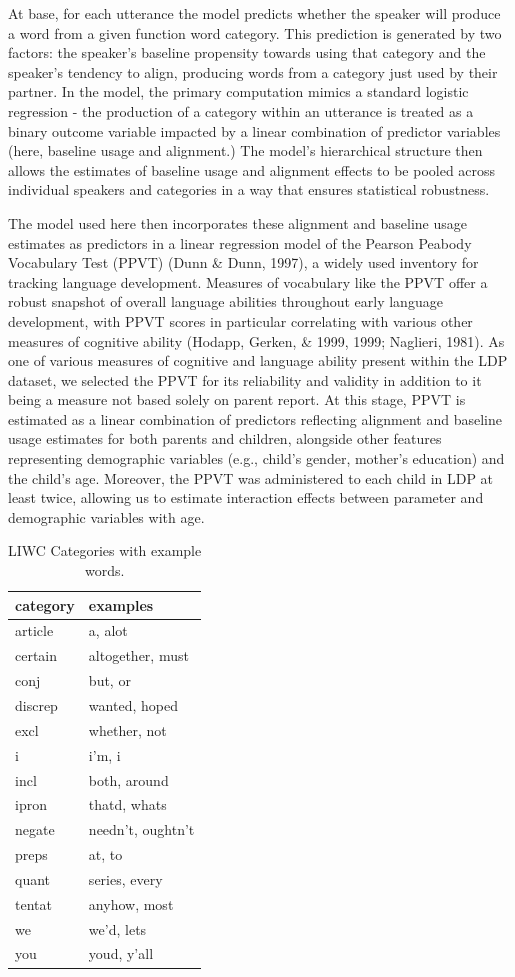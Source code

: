 \documentclass[10pt, letterpaper]{article}
\begin{document}
At base, for each utterance the model predicts whether the speaker will
produce a word from a given function word category. This prediction is
generated by two factors: the speaker's baseline propensity towards
using that category and the speaker's tendency to align, producing words
from a category just used by their partner. In the model, the primary
computation mimics a standard logistic regression - the production of a
category within an utterance is treated as a binary outcome variable
impacted by a linear combination of predictor variables (here, baseline
usage and alignment.) The model's hierarchical structure then allows the
estimates of baseline usage and alignment effects to be pooled across
individual speakers and categories in a way that ensures statistical
robustness.

The model used here then incorporates these alignment and baseline usage
estimates as predictors in a linear regression model of the Pearson
Peabody Vocabulary Test (PPVT) (Dunn \& Dunn, 1997), a widely used
inventory for tracking language development. Measures of vocabulary like
the PPVT offer a robust snapshot of overall language abilities
throughout early language development, with PPVT scores in particular
correlating with various other measures of cognitive ability (Hodapp,
Gerken, \& 1999, 1999; Naglieri, 1981). As one of various measures of
cognitive and language ability present within the LDP dataset, we
selected the PPVT for its reliability and validity in addition to it
being a measure not based solely on parent report. At this stage, PPVT
is estimated as a linear combination of predictors reflecting alignment
and baseline usage estimates for both parents and children, alongside
other features representing demographic variables (e.g., child's gender,
mother's education) and the child's age. Moreover, the PPVT was
administered to each child in LDP at least twice, allowing us to
estimate interaction effects between parameter and demographic variables
with age.

\begin{table}[H]
\centering
\begin{tabular}{ll}
  \hline
category & examples \\ 
  \hline
article & a, alot \\ 
  certain & altogether, must \\ 
  conj & but, or \\ 
  discrep & wanted, hoped \\ 
  excl & whether, not \\ 
  i & i'm, i \\ 
  incl & both, around \\ 
  ipron & thatd, whats \\ 
  negate & needn't, oughtn't \\ 
  preps & at, to \\ 
  quant & series, every \\ 
  tentat & anyhow, most \\ 
  we & we'd, lets \\ 
  you & youd, y'all \\ 
   \hline
\end{tabular}
\caption{LIWC Categories with example words.} 
\end{table}
\end{document}
